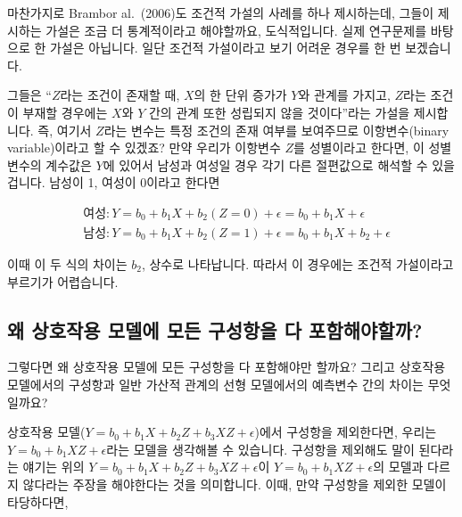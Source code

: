 \documentclass[
]{book}
\begin{document}
마찬가지로 Brambor al.~(2006)도 조건적 가설의 사례를 하나 제시하는데, 그들이 제시하는 가설은 조금 더 통계적이라고 해야할까요, 도식적입니다. 실제 연구문제를 바탕으로 한 가설은 아닙니다. 일단 조건적 가설이라고 보기 어려운 경우를 한 번 보겠습니다.

그들은 ``\(Z\)라는 조건이 존재할 때, \(X\)의 한 단위 증가가 \(Y\)와 관계를 가지고, \(Z\)라는 조건이 부재할 경우에는 \(X\)와 \(Y\) 간의 관계 또한 성립되지 않을 것이다''라는 가설을 제시합니다. 즉, 여기서 \(Z\)라는 변수는 특정 조건의 존재 여부를 보여주므로 이항변수(binary variable)이라고 할 수 있겠죠? 만약 우리가 이항변수 \(Z\)를 성별이라고 한다면, 이 성별 변수의 계수값은 \(Y\)에 있어서 남성과 여성일 경우 각기 다른 절편값으로 해석할 수 있을 겁니다. 남성이 1, 여성이 0이라고 한다면

\begin{equation*}
\begin{aligned}
&\text{여성}: Y = b_0 + b_1X + b_2(Z=0) + \epsilon = b_0 + b_1X + \epsilon \\
&\text{남성}: Y = b_0 + b_1X + b_2(Z=1) + \epsilon = b_0 + b_1X + b_2 + \epsilon
\end{aligned}
\end{equation*}

이때 이 두 식의 차이는 \(b_2\), 상수로 나타납니다. 따라서 이 경우에는 조건적 가설이라고 부르기가 어렵습니다.

\hypertarget{uxc65c-uxc0c1uxd638uxc791uxc6a9-uxbaa8uxb378uxc5d0-uxbaa8uxb4e0-uxad6cuxc131uxd56duxc744-uxb2e4-uxd3ecuxd568uxd574uxc57cuxd560uxae4c}{%
\subsection{왜 상호작용 모델에 모든 구성항을 다 포함해야할까?}\label{uxc65c-uxc0c1uxd638uxc791uxc6a9-uxbaa8uxb378uxc5d0-uxbaa8uxb4e0-uxad6cuxc131uxd56duxc744-uxb2e4-uxd3ecuxd568uxd574uxc57cuxd560uxae4c}}

그렇다면 왜 상호작용 모델에 모든 구성항을 다 포함해야만 할까요? 그리고 상호작용 모델에서의 구성항과 일반 가산적 관계의 선형 모델에서의 예측변수 간의 차이는 무엇일까요?

상호작용 모델(\(Y = b_0 + b_1X + b_2Z + b_3XZ + \epsilon\))에서 구성항을 제외한다면, 우리는 \(Y = b_0 + b_1XZ + \epsilon\)라는 모델을 생각해볼 수 있습니다. 구성항을 제외해도 말이 된다라는 얘기는 위의 \(Y = b_0 + b_1X + b_2Z + b_3XZ + \epsilon\)이 \(Y = b_0 + b_1XZ + \epsilon\)의 모델과 다르지 않다라는 주장을 해야한다는 것을 의미합니다. 이때, 만약 구성항을 제외한 모델이 타당하다면,
\end{document}
